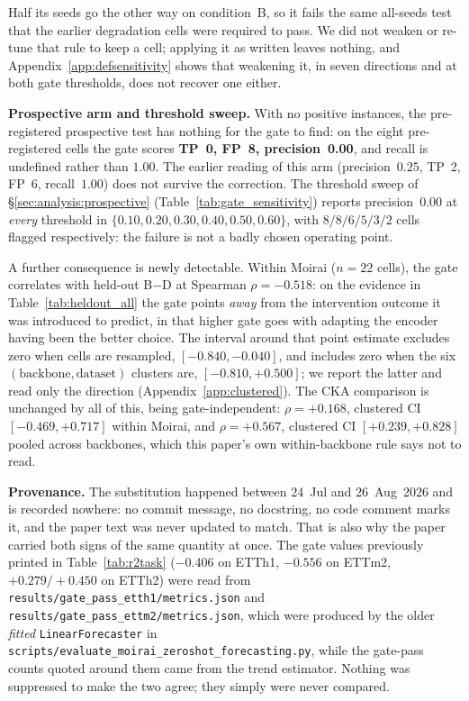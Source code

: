\noindent Half its seeds go the other way on condition~B, so it fails the
same all-seeds test that the earlier degradation cells were required to pass.
We did not weaken or re-tune that rule to keep a cell; applying it as written
leaves nothing, and Appendix~\ref{app:defsensitivity} shows that weakening it,
in seven directions and at both gate thresholds, does not recover one either.

\textbf{Prospective arm and threshold sweep.} With no positive instances, the
pre-registered prospective test has nothing for the gate to find: on the eight
pre-registered cells the gate scores \textbf{TP~0, FP~8, precision~0.00}, and
recall is undefined rather than $1.00$. The earlier reading of this arm
(precision~$0.25$, TP~2, FP~6, recall~$1.00$) does not survive the correction.
The threshold sweep of \S\ref{sec:analysis:prospective}
(Table~\ref{tab:gate_sensitivity}) reports precision~$0.00$ at
\emph{every} threshold in $\{0.10, 0.20, 0.30, 0.40, 0.50, 0.60\}$, with
$8/8/6/5/3/2$ cells flagged respectively: the failure is not a badly chosen
operating point.

A further consequence is newly detectable. Within Moirai ($n{=}22$ cells), the
gate correlates with held-out B$-$D at Spearman $\rho = -0.518$: on the evidence
in Table~\ref{tab:heldout_all} the gate points \emph{away} from the intervention
outcome it was introduced to predict, in that higher gate goes with adapting the
encoder having been the better choice. The interval around that point estimate
excludes zero when cells are resampled, $[-0.840, -0.040]$, and includes zero
when the six $(\text{backbone}, \text{dataset})$ clusters are,
$[-0.810, +0.500]$; we report the latter and read only the direction
(Appendix~\ref{app:clustered}). The CKA comparison is unchanged by all of this,
being gate-independent: $\rho = +0.168$, clustered CI $[-0.469, +0.717]$ within
Moirai, and $\rho = +0.567$, clustered CI $[+0.239, +0.828]$ pooled across
backbones, which this paper's own within-backbone rule says not to read.

\textbf{Provenance.} The substitution happened between 24~Jul and 26~Aug~2026
and is recorded nowhere: no commit message, no docstring, no code comment
marks it, and the paper text was never updated to match. That is also why the
paper carried both signs of the same quantity at once. The
gate values previously printed in Table~\ref{tab:r2task}
($-0.406$ on ETTh1, $-0.556$ on ETTm2, $+0.279/+0.450$ on ETTh2) were read
from \texttt{results/gate\_pass\_etth1/metrics.json} and
\texttt{results/gate\_pass\_ettm2/metrics.json}, which were produced by the
older \emph{fitted} \texttt{LinearForecaster} in
\texttt{scripts/evaluate\_moirai\_zeroshot\_forecasting.py}, while the
gate-pass counts quoted around them came from the trend estimator. Nothing was
suppressed to make the two agree; they simply were never compared.

